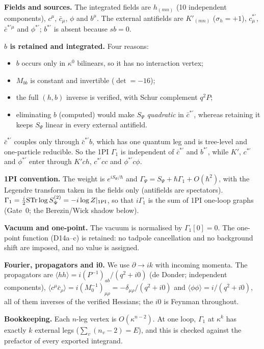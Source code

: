 \textbf{Fields and sources.} The integrated fields are $h_{(mn)}$ (10 independent components), $c^\mu$, $\bar c_\mu$,
$\phi$ and $b^\mu$. The external antifields are $K'_{(mn)}$ ($\sigma_h=+1$), $c^{*\prime}_\mu$, $\bar c^{*\prime\mu}$ and
$\phi^{*\prime}$; $b^{*\prime}$ is absent because $sb=0$.

\textbf{$b$ is retained and integrated.} Four reasons:
\begin{itemize}
\item $b$ occurs only in $\kappa^0$ bilinears, so it has no interaction vertex;
\item $M_{bb}$ is constant and invertible ($\det=-16$);
\item the full $(h,b)$ inverse is verified, with Schur complement $q^2P$;
\item eliminating $b$ (computed) would make $S_\Psi$ \emph{quadratic} in $\bar c^{*\prime}$, whereas retaining it keeps
$S_\Psi$ linear in every external antifield.
\end{itemize}
$\bar c^{*\prime}$ couples only through $\bar c^{*\prime}b$, which has one quantum leg and is tree-level and
one-particle reducible. So the 1PI $\Gamma_1$ is independent of $\bar c^{*\prime}$ and $b^{*\prime}$, while $K'$,
$c^{*\prime}$ and $\phi^{*\prime}$ enter through $K'ch$, $c^{*\prime}cc$ and $\phi^{*\prime}c\phi$.

\textbf{1PI convention.} The weight is $e^{iS_\Psi/\hbar}$ and $\Gamma_\Psi=S_\Psi+\hbar\Gamma_1+O(\hbar^2)$, with the
Legendre transform taken in the fields only (antifields are spectators). $\Gamma_1=\tfrac i2{\rm STr}\log S^{(2)}_\Psi
=-i\log Z|_{\rm 1PI}$, so that $i\Gamma_1$ is the sum of 1PI one-loop graphs (Gate~0; the Berezin/Wick shadow below).

\textbf{Vacuum and one-point.} The vacuum is normalised by $\Gamma_1[0]=0$. The one-point function (D14a--c) is retained:
no tadpole cancellation and no background shift are imposed, and no value is assigned.

\textbf{Fourier, propagators and i0.} We use $\partial\to ik$ with incoming momenta. The propagators are
$\langle hh\rangle=i(P^{-1})_{ab}/(q^2+i0)$ (de Donder; independent components),
$\langle c^\mu\bar c_\rho\rangle=i(M_0^{-1})_{\mu\rho}=-\delta_{\mu\rho}/(q^2+i0)$ and $\langle\phi\phi\rangle=i/(q^2+i0)$,
all of them inverses of the verified Hessians; the $i0$ is Feynman throughout.

\textbf{Bookkeeping.} Each $n$-leg vertex is $O(\kappa^{n-2})$. At one loop, $\Gamma_1$ at $\kappa^k$ has exactly $k$
external legs ($\sum_v(n_v-2)=E$), and this is checked against the prefactor of every exported integrand.

